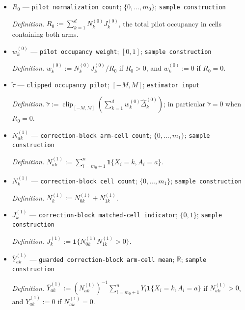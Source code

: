 \documentclass{article}
\begin{document}
\begin{itemize}
  \par\smallskip\noindent\emph{Definition.} \(\widehat\Delta_k^{(0)}:=J_k^{(0)}(\overline Y_{1k}^{(0)}-\overline Y_{0k}^{(0)})\); hence it is zero in an empty or one-arm-only pilot cell.
  \item \(R_0\) --- \texttt{pilot normalization count}; \(\{0,\ldots,m_0\}\); \texttt{sample construction}
  \par\smallskip\noindent\emph{Definition.} \(R_0:=\sum_{k=1}^dN_k^{(0)}J_k^{(0)}\), the total pilot occupancy in cells containing both arms.
  \item \(w_k^{(0)}\) --- \texttt{pilot occupancy weight}; \([0,1]\); \texttt{sample construction}
  \par\smallskip\noindent\emph{Definition.} \(w_k^{(0)}:=N_k^{(0)}J_k^{(0)}/R_0\) if \(R_0>0\), and \(w_k^{(0)}:=0\) if \(R_0=0\).
  \item \(\widetilde\tau\) --- \texttt{clipped occupancy pilot}; \([-M,M]\); \texttt{estimator input}
  \par\smallskip\noindent\emph{Definition.} \(\widetilde\tau:=\operatorname{clip}_{[-M,M]}(\sum_{k=1}^dw_k^{(0)}\widehat\Delta_k^{(0)})\); in particular \(\widetilde\tau=0\) when \(R_0=0\).
  \item \(N_{ak}^{(1)}\) --- \texttt{correction-\allowbreak{}block arm-\allowbreak{}cell count}; \(\{0,\ldots,m_1\}\); \texttt{sample construction}
  \par\smallskip\noindent\emph{Definition.} \(N_{ak}^{(1)}:=\sum_{i=m_0+1}^n\mathbf 1\{X_i=k,A_i=a\}\).
  \item \(N_k^{(1)}\) --- \texttt{correction-\allowbreak{}block cell count}; \(\{0,\ldots,m_1\}\); \texttt{sample construction}
  \par\smallskip\noindent\emph{Definition.} \(N_k^{(1)}:=N_{0k}^{(1)}+N_{1k}^{(1)}\).
  \item \(J_k^{(1)}\) --- \texttt{correction-\allowbreak{}block matched-\allowbreak{}cell indicator}; \(\{0,1\}\); \texttt{sample construction}
  \par\smallskip\noindent\emph{Definition.} \(J_k^{(1)}:=\mathbf 1\{N_{0k}^{(1)}N_{1k}^{(1)}>0\}\).
  \item \(\overline Y_{ak}^{(1)}\) --- \texttt{guarded correction-\allowbreak{}block arm-\allowbreak{}cell mean}; \(\mathbb R\); \texttt{sample construction}
  \par\smallskip\noindent\emph{Definition.} \(\overline Y_{ak}^{(1)}:=(N_{ak}^{(1)})^{-1}\sum_{i=m_0+1}^nY_i\mathbf 1\{X_i=k,A_i=a\}\) if \(N_{ak}^{(1)}>0\), and \(\overline Y_{ak}^{(1)}:=0\) if \(N_{ak}^{(1)}=0\).

\end{itemize}
\end{document}
